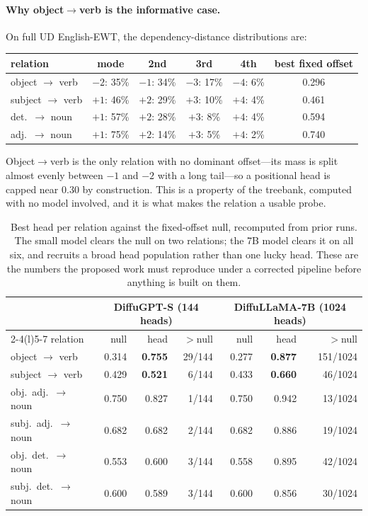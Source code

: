 \documentclass{article}
\begin{document}
\paragraph{Why object$\to$verb is the informative case.} On full UD English-EWT,
the dependency-distance distributions are:

\begin{center}\small
\begin{tabular}{lccccc}
\toprule
relation & mode & 2nd & 3rd & 4th & best fixed offset \\
\midrule
object $\to$ verb        & $-2$: 35\% & $-1$: 34\% & $-3$: 17\% & $-4$: 6\% & 0.296 \\
subject $\to$ verb       & $+1$: 46\% & $+2$: 29\% & $+3$: 10\% & $+4$: 4\% & 0.461 \\
det.\ $\to$ noun         & $+1$: 57\% & $+2$: 28\% & $+3$: 8\%  & $+4$: 4\% & 0.594 \\
adj.\ $\to$ noun         & $+1$: 75\% & $+2$: 14\% & $+3$: 5\%  & $+4$: 2\% & 0.740 \\
\bottomrule
\end{tabular}
\end{center}

Object$\to$verb is the only relation with no dominant offset---its mass is split
almost evenly between $-1$ and $-2$ with a long tail---so a positional head is
capped near $0.30$ by construction. This is a property of the treebank, computed
with no model involved, and it is what makes the relation a usable probe.

\begin{table}[t]
\caption{Best head per relation against the fixed-offset null, recomputed from
prior runs. The small model clears the null on two relations; the 7B model
clears it on all six, and recruits a broad head population rather than one
lucky head. These are the numbers the proposed work must reproduce under a
corrected pipeline before anything is built on them.}
\label{tab:pilot}
\centering\small
\begin{tabular}{lrrrrrr}
\toprule
& \multicolumn{3}{c}{DiffuGPT-S (144 heads)} & \multicolumn{3}{c}{DiffuLLaMA-7B (1024 heads)} \\
\cmidrule(r){2-4}\cmidrule(l){5-7}
relation & null & head & $>$null & null & head & $>$null \\
\midrule
object $\to$ verb        & 0.314 & \textbf{0.755} & 29/144 & 0.277 & \textbf{0.877} & 151/1024 \\
subject $\to$ verb       & 0.429 & \textbf{0.521} & 6/144  & 0.433 & \textbf{0.660} & 46/1024 \\
obj.\ adj.\ $\to$ noun   & 0.750 & 0.827 & 1/144  & 0.750 & 0.942 & 13/1024 \\
subj.\ adj.\ $\to$ noun  & 0.682 & 0.682 & 2/144  & 0.682 & 0.886 & 19/1024 \\
obj.\ det.\ $\to$ noun   & 0.553 & 0.600 & 3/144  & 0.558 & 0.895 & 42/1024 \\
subj.\ det.\ $\to$ noun  & 0.600 & 0.589 & 3/144  & 0.600 & 0.856 & 30/1024 \\
\bottomrule
\end{tabular}
\end{table}
\end{document}
